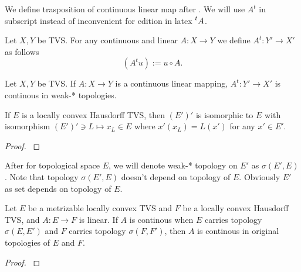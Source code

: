 \documentclass[main.tex]{subfiles}
\begin{document}
We define trasposition of continuous linear map after \cite{treves1970}. We will use $A^t$ in subscript instead of inconvenient for edition in latex $\prescript{t}{}{A}$.   
\begin{definition}
Let $X, Y$ be TVS.
For any continuous and linear $A:X\to Y$ we define $A^t:Y'\to X'$ as follows
\begin{equation}
(A^t u) := u \circ A.    
\end{equation}
\end{definition}
\begin{corollary}
\label{linear-transposition-continous}
Let $X, Y$ be TVS.
If $A:X\to Y$ is a continuous linear mapping, $A^t: Y'\to X'$ is continous in weak-* topologies.
\end{corollary}

\begin{theorem}
\label{locally-convex-reflexivity}
If $E$ is a locally convex Hausdorff TVS, then $(E')'$ is isomorphic to $E$ with isomorphism $(E')'\ni L\mapsto x_L\in E$ where $x'(x_L) = L(x')$ for any $x'\in E'$.
\end{theorem}
\begin{proof}
\cite[See][35.1]{treves1970}
\end{proof}

After \cite{treves1970} for topological space $E$, we will denote weak-* topology on $E'$ as $\sigma(E', E)$. Note that topology $\sigma(E', E)$ doesn't depend on topology of $E$. Obviously $E'$ as set depends on topology of $E$.

\begin{theorem}
\label{upgrade-continuity-from-weak-to-original}
Let $E$ be a metrizable locally convex TVS and $F$ be a locally convex Hausdorff TVS, and $A:E\to F$ is linear. If $A$ is continous when $E$ carries topology $\sigma(E, E')$ and $F$ carries topology $\sigma(F,F')$, then $A$ is continous in original topologies of $E$ and $F$. 
\end{theorem}
\begin{proof}
\cite[See][37.6]{treves1970}
\end{proof}
\end{document}
